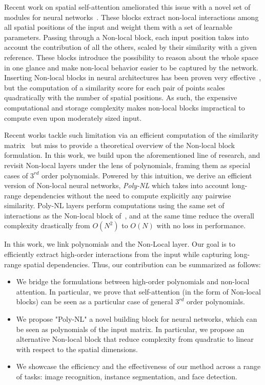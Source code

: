 \documentclass[10pt,twocolumn,letterpaper]{article}
\begin{document}
Recent work on spatial self-attention ameliorated this issue with a novel set of modules for neural networks~\cite{wang2018non, vaswani2017attention}. These blocks extract non-local interactions among all spatial positions of the input and weight them with a set of learnable parameters. Passing through a Non-local block, each input position takes into account the contribution of all the others, scaled by their similarity with a given reference. These blocks introduce the possibility to reason about the whole space in one glance and make non-local behavior easier to be captured by the network. Inserting Non-local blocks in neural architectures has been proven very effective~\cite{Bello_2019_ICCV,dai2019second,wang2019edvr,ott2018scaling,ramachandran2019stand, mohamed2019transformers}, but the computation of a similarity score for each pair of points scales quadratically with the number of spatial positions. As such, the expensive computational and storage complexity makes non-local blocks impractical to compute even upon moderately sized input. 

Recent works tackle such limitation via an efficient computation of the similarity matrix~\cite{zhang2019latentgnn, liu2019spatially, shen2021efficient} but miss to provide a theoretical overview of the Non-local block formulation. 
In this work, we build upon the aforementioned line of research, and revisit Non-local layers under the lens of polynomials, framing them as special cases of $3^{rd}$ order polynomials. Powered by this intuition, we derive an efficient version of Non-local neural networks, \textit{Poly-NL} which takes into account long-range dependencies without the need to compute explicitly any pairwise similarity. Poly-NL layers perform computations using the same set of interactions as the Non-local block of~\cite{wang2018non}, and at the same time reduce the overall complexity drastically from $O(N^2)$ to $O(N)$ with no loss in performance.

In this work, we link polynomials and the Non-Local layer. Our goal is to efficiently extract high-order interactions from the input while capturing long-range spatial dependencies. Thus, our contribution can be summarized as follows:
\begin{itemize}
    \item We bridge the formulations between high-order polynomials and non-local attention. In particular, we prove that self-attention (in the form of Non-local blocks) can be seen as a particular case of general $3^{rd}$ order polynomials.

    \item We propose "Poly-NL" a novel building block for neural networks, which can be seen as polynomials of the input matrix. In particular, we propose an alternative Non-local block that reduce complexity from quadratic to linear with respect to the spatial dimensions. 
    
    \item We showcase the efficiency and the effectiveness of our method across a range of tasks: image recognition, instance segmentation, and face detection.
    
\end{itemize}
\end{document}
